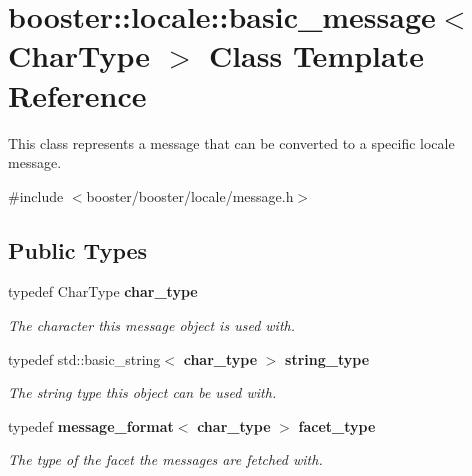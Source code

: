 \section{booster\+:\+:locale\+:\+:basic\+\_\+message$<$ Char\+Type $>$ Class Template Reference}
\label{classbooster_1_1locale_1_1basic__message}


This class represents a message that can be converted to a specific locale message.  




{\ttfamily \#include $<$booster/booster/locale/message.\+h$>$}

\subsection*{Public Types}
\begin{DoxyCompactItemize}
\item 
typedef Char\+Type {\bf char\+\_\+type}
\begin{DoxyCompactList}\small\item\em The character this message object is used with. \end{DoxyCompactList}\item 
typedef std\+::basic\+\_\+string$<$ {\bf char\+\_\+type} $>$ {\bf string\+\_\+type}
\begin{DoxyCompactList}\small\item\em The string type this object can be used with. \end{DoxyCompactList}\item 
typedef {\bf message\+\_\+format}$<$ {\bf char\+\_\+type} $>$ {\bf facet\+\_\+type}
\begin{DoxyCompactList}\small\item\em The type of the facet the messages are fetched with. \end{DoxyCompactList}\end{DoxyCompactItemize}
